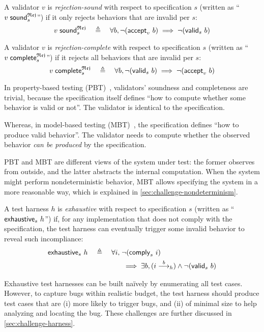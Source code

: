 \begin{definition}
  A validator $v$ is {\em rejection-sound} with respect to specification $s$
  (written as ``$\rejSound v s$'') if it only rejects behaviors that are invalid
  per $s$:
  \[\rejSound v s\quad\triangleq\quad\forall b,\rejects v b\implies\invalid s b\]

  A validator $v$ is {\em rejection-complete} with respect to specification $s$
  (written as ``$\rejComplete v s$'') if it rejects all behaviors that are
  invalid per $s$:
  \[\rejComplete v s\quad\triangleq\quad\forall b,\invalid s b\implies\rejects v b\]
\end{definition}

In property-based testing (PBT)~\cite{pbt}, validators' soundness and
completeness are trivial, because the specification itself defines ``how to
compute whether some behavior is valid or not''.  The validator is identical to
the specification.

Whereas, in model-based testing (MBT)~\cite{broy2005model}, the specification
defines ``how to produce valid behavior''.  The validator needs to compute
whether the observed behavior {\em can be produced} by the specification.

PBT and MBT are different views of the system under test: the former observes
from outside, and the latter abstracts the internal computation.  When the
system might perform nondeterministic behavior, MBT allows specifying the system
in a more reasonable way, which is explained in
\autoref{sec:challenge-nondeterminism}.

\begin{definition}
  A test harness $h$ is {\em exhaustive} with respect to specification $s$
  (written as ``$\exhaustive s h$'') if, for any implementation that does not
  comply with the specification, the test harness can eventually trigger some
  invalid behavior to reveal such incompliance:
  \begin{align*}
    \exhaustive s h\quad\triangleq\quad\forall i,\;&\ncomplies s i \\
    &\implies \exists b,(\triggers i h b)\wedge\invalid s b
  \end{align*}
\end{definition}

Exhaustive test harnesses can be built na\"ively by enumerating all test cases.
However, to capture bugs within realistic budget, the test harness should
produce test cases that are (i) more likely to trigger bugs, and (ii) of minimal
size to help analyzing and locating the bug.  These challenges are further
discussed in \autoref{sec:challenge-harness}.
